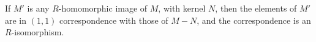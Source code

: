 If $M'$ is any $R$-homomorphic image of $M$, with kernel $N$, then the elements of $M'$ are in $(1,1)$ correspondence with those of $M - N$, and the correspondence is an $R$-isomorphism.
